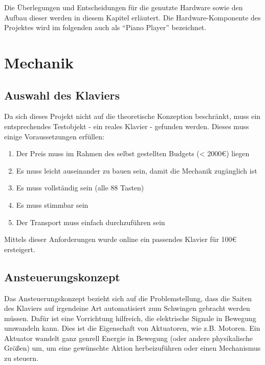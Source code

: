 Die Überlegungen und Entscheidungen für die genutzte Hardware sowie den Aufbau dieser werden in diesem Kapitel erläutert.
Die Hardware-Komponente des Projektes wird im folgenden auch als \enquote{Piano Player} bezeichnet.

\section{Mechanik}\label{konzeptionHW-mechanik}

\subsection{Auswahl des Klaviers}


Da sich dieses Projekt nicht auf die theoretische Konzeption beschränkt, muss ein entsprechendes Testobjekt - ein reales Klavier - gefunden werden.
Dieses muss einige Voraussetzungen erfüllen:
\begin{enumerate}
	\item 	Der Preis muss im Rahmen des selbst gestellten Budgets (< 2000\euro{}) liegen
	\item 	Es muss leicht auseinander zu bauen sein, damit die Mechanik zugänglich ist
	\item 	Es muss vollständig sein (alle 88 Tasten)
	\item 	Es muss stimmbar sein
	\item 	Der Transport muss einfach durchzuführen sein
\end{enumerate}

Mittels dieser Anforderungen wurde online ein passendes Klavier für 100\euro{} ersteigert.

\subsection{Ansteuerungskonzept} \label{subsec:konzeptionhw-ansteuerungskonzept}


Das Ansteuerungskonzept bezieht sich auf die Problemstellung, dass die Saiten des Klaviers auf irgendeine Art automatisiert zum Schwingen gebracht werden müssen.
Dafür ist eine Vorrichtung hilfreich, die elektrische Signale in Bewegung umwandeln kann.
Dies ist die Eigenschaft von Aktuatoren, wie z.B. Motoren.
Ein Aktuator wandelt ganz genrell Energie in Bewegung (oder andere physikalische Größen) um, um eine gewünschte Aktion herbeizuführen oder einen Mechanismus zu steuern. \newline %

